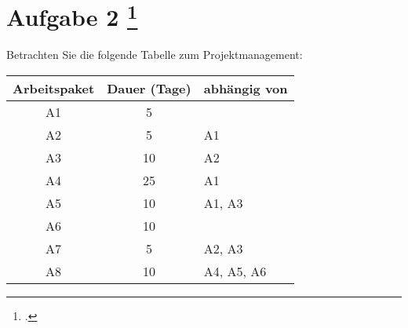 \documentclass{lehramt-informatik-aufgabe}
\begin{document}
\section{Aufgabe 2
\footcite{66116:2020:09}}

Betrachten Sie die folgende Tabelle zum Projektmanagement:

\begin{center}
\begin{tabular}{|c|c|l|}
\hline
\textbf{Arbeitspaket} & \textbf{Dauer (Tage)} & \textbf{abhängig von}\\\hline
A1 & 5  & \\\hline
A2 & 5  & A1 \\\hline
A3 & 10 & A2 \\\hline
A4 & 25 & A1 \\\hline
A5 & 10 & A1, A3\\\hline
A6 & 10 & \\\hline
A7 & 5  & A2, A3 \\\hline
A8 & 10 & A4, A5, A6 \\\hline
\end{tabular}
\end{center}
\end{document}
